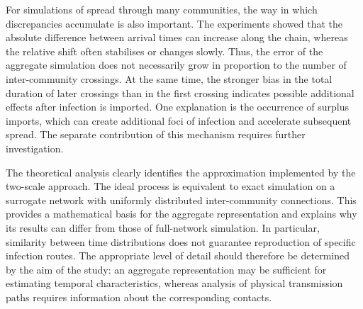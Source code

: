 \documentclass{ieeeaccess}
\begin{document}
For simulations of spread through many communities, the way in which discrepancies accumulate is also important. The experiments showed that the absolute difference between arrival times can increase along the chain, whereas the relative shift often stabilises or changes slowly. Thus, the error of the aggregate simulation does not necessarily grow in proportion to the number of inter-community crossings. At the same time, the stronger bias in the total duration of later crossings than in the first crossing indicates possible additional effects after infection is imported. One explanation is the occurrence of surplus imports, which can create additional foci of infection and accelerate subsequent spread. The separate contribution of this mechanism requires further investigation.

The theoretical analysis clearly identifies the approximation implemented by the two-scale approach. The ideal process is equivalent to exact simulation on a surrogate network with uniformly distributed inter-community connections. This provides a mathematical basis for the aggregate representation and explains why its results can differ from those of full-network simulation. In particular, similarity between time distributions does not guarantee reproduction of specific infection routes. The appropriate level of detail should therefore be determined by the aim of the study: an aggregate representation may be sufficient for estimating temporal characteristics, whereas analysis of physical transmission paths requires information about the corresponding contacts.
\end{document}
